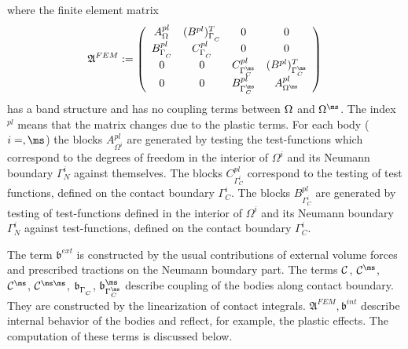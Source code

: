 where the finite element matrix
\begin{equation*}
\mathfrak{A}^{FEM} :=
   \left (
   \begin{array}{cccc}
   A^{pl}_{\Omega^{\sl}}    & (B^{pl})^{T}_{\Gamma^{\sl}_C} & 0                & 0\\
   B^{pl}_{\Gamma^{\sl}_C}  & C^{pl}_{\Gamma^{\sl}_C}     & 0                & 0 \\
   0               & 0                  & C^{pl}_{\Gamma^{\ms}_C}   & (B^{pl})^T_{\Gamma^{\ms}_C} \\
   0               & 0                  & B^{pl}_{\Gamma^{\ms}_C}   & A^{pl}_{\Omega^{\ms}}
   \end{array}
   \right )
\end{equation*}
has a band structure and has no coupling terms between $\Omega^{\sl}$ and $\Omega^{\ms}$. The index $^{pl}$ means that the matrix changes due to the plastic terms. For each body ($i=\sl,\ms$) the blocks $A^{pl}_{\Omega^i}$ are generated by testing the test-functions which correspond to the degrees of freedom in the interior of $\Omega^i$ and its Neumann boundary $\Gamma^i_N$ against themselves. The blocks $C^{pl}_{\Gamma^i_C}$ correspond to the testing of test functions, defined on the contact boundary $\Gamma^i_C$. The blocks $B^{pl}_{\Gamma^i_C}$ are generated by testing of test-functions defined in the interior of $\Omega^i$ and its Neumann boundary $\Gamma^i_N$ against test-functions, defined on the contact boundary $\Gamma^i_C$.

The term ${\mathfrak b}^{ext}$ is constructed by the usual contributions of external volume forces and prescribed tractions on the Neumann boundary part. The terms $\mathcal{C}^{\sl\sl}$, $\mathcal{C}^{\sl \ms}$, $\mathcal{C}^{\ms \sl}$, $\mathcal{C}^{\ms \ms}$, ${\mathfrak b}^{\sl}_{\Gamma_C^{\sl}}$,   ${\mathfrak b}^{\ms}_{\Gamma_C^{\ms}}$ describe coupling of the bodies along contact boundary. They are constructed by the linearization of contact integrals. $\mathfrak{A}^{FEM}, {\mathfrak b}^{int}$ describe internal behavior of the bodies and reflect, for example, the plastic effects. The computation of these terms is discussed below. 


